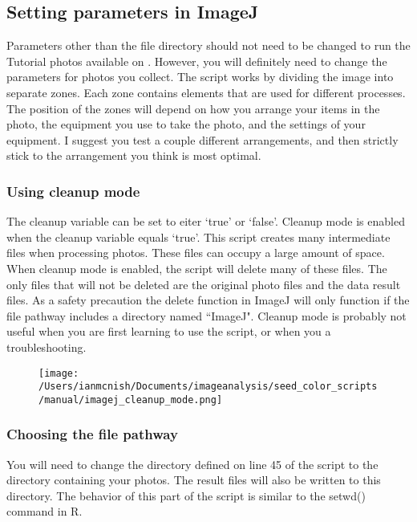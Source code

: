\documentclass[12pt]{article}
\begin{document}
\subsection{Setting parameters in ImageJ}\label{sec:parameters}

\noindent Parameters other than the file directory should not need to be changed to run the Tutorial photos available on . However, you will definitely need to change the parameters for photos you collect. The script works by dividing the image into separate zones. Each zone contains elements that are used for different processes. The position of the zones will depend on how you arrange your items in the photo, the equipment you use to take the photo, and the settings of your equipment. I suggest you test a couple different arrangements, and then strictly stick to the arrangement you think is most optimal.\\

\subsubsection{Using cleanup mode}

\noindent The cleanup variable can be set to eiter `true' or `false'. Cleanup mode is enabled when the cleanup variable equals `true'. This script creates many intermediate files when processing photos. These files can occupy a large amount of space. When cleanup mode is enabled, the script will delete many of these files. The only files that will not be deleted are the original photo files and the data result files. As a safety precaution the delete function in ImageJ will only function if the file pathway includes a directory named ``ImageJ". Cleanup mode is probably not useful when you are first learning to use the script, or when you a troubleshooting.\\

\begin{figure}[H]
	\centering
	\texttt{[image: /Users/ianmcnish/Documents/imageanalysis/seed\_color\_scripts/manual/imagej\_cleanup\_mode.png]}
	\label{fig:open_imagej_script_3}
\end{figure}

\subsubsection{Choosing the file pathway}\label{sec:pathway}

\noindent You will need to change the directory defined on line 45 of the script to the directory containing your photos. The result files will also be written to this directory. The behavior of this part of the script is similar to the setwd() command in R.\\
\end{document}
